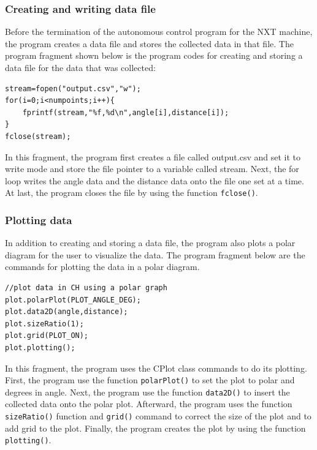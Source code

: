 \documentclass[12pt]{article}
\begin{document}
\subsubsection*{Creating and writing data file}
Before the termination of the autonomous control program for the NXT machine, the program creates 
   a data file and stores the collected data in that file.
The program fragment shown below is the program codes for creating and storing a data file for
   the data that was collected:
\begin{verbatim}
stream=fopen("output.csv","w");
for(i=0;i<numpoints;i++){
    fprintf(stream,"%f,%d\n",angle[i],distance[i]);
}
fclose(stream);
\end{verbatim}
In this fragment, the program first creates a file called output.csv and set it to write mode and
    store the file pointer to a variable called stream.
Next, the for loop writes the angle data and the distance data onto the file one set at a time.
At last, the program closes the file by using the function \verb+fclose()+.
\subsubsection*{Plotting data}
In addition to creating and storing a data file, the program also plots a polar diagram for
    the user to visualize the data.
The program fragment below are the commands for plotting the data in a polar diagram.
\begin{verbatim}
//plot data in CH using a polar graph
plot.polarPlot(PLOT_ANGLE_DEG);
plot.data2D(angle,distance);
plot.sizeRatio(1);
plot.grid(PLOT_ON); 
plot.plotting();
\end{verbatim}
In this fragment, the program uses the CPlot class commands to do its plotting.
First, the program use the function \verb+polarPlot()+ to set the plot to polar and degrees in angle.
Next, the program use the function \verb+data2D()+ to insert the collected data onto the polar plot.
Afterward, the program uses the function \verb+sizeRatio()+ function and \verb+grid()+ command to
    correct the size of the plot and to add grid to the plot.
Finally, the program creates the plot by using the function \verb+plotting()+.
\newpage
\end{document}
